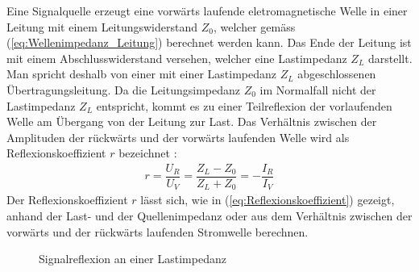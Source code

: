 Eine Signalquelle erzeugt eine vorwärts laufende eletromagnetische Welle in einer Leitung mit einem Leitungswiderstand $Z_0$, welcher gemäss (\ref{eq:Wellenimpedanz_Leitung}) berechnet werden kann. Das Ende der Leitung ist mit einem Abschlusswiderstand versehen, welcher eine Lastimpedanz $Z_L$ darstellt. Man spricht deshalb von einer mit einer Lastimpedanz $Z_L$ abgeschlossenen Übertragungsleitung. Da die Leitungsimpedanz $Z_0$ im Normalfall nicht der Lastimpedanz $Z_L$ entspricht, kommt es zu einer   Teilreflexion der vorlaufenden Welle am Übergang von der Leitung zur Last. Das Verhältnis zwischen der Amplituden der rückwärts und der vorwärts laufenden Welle wird als Reflexionskoeffizient $r$ bezeichnet \cite{Tekom}: \\
\begin{eqnarray}\label{eq:Reflexionskoeffizient}
r=\dfrac{U_{R}}{U_{V}}=\dfrac{Z_{L}-Z_{0}}{Z_{L}+Z_{0}}=-\dfrac{I_{R}}{I_{V}}
\end{eqnarray}
Der Reflexionskoeffizient $r$ lässt sich, wie in (\ref{eq:Reflexionskoeffizient}) gezeigt, anhand der Last- und der Quellenimpedanz oder aus dem Verhältnis zwischen der vorwärts und der rückwärts laufenden Stromwelle berechnen.

\begin{figure}[!ht]
	\begin{center}
	\end{center}
\caption{Signalreflexion an einer Lastimpedanz}
\label{fig:Leitung_Mit_ZL}
\end{figure}

